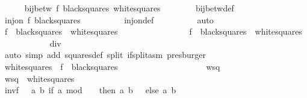 \begin{isabellebody}
\ \ \ \ \isamarkupfalse%
\ {\isachardoublequoteopen}bij{\isacharunderscore}betw\ {\isacharquery}f\ {\isacharquery}black{\isacharunderscore}squares\ {\isacharquery}white{\isacharunderscore}squares{\isachardoublequoteclose}\isanewline
\ \ \ \ \ \ \isamarkupfalse%
\ bij{\isacharunderscore}betw{\isacharunderscore}def\isanewline
\ \ \ \ \isamarkupfalse%
\isanewline
\ \ \ \ \ \ \isamarkupfalse%
\ {\isachardoublequoteopen}inj{\isacharunderscore}on\ {\isacharquery}f\ {\isacharquery}black{\isacharunderscore}squares{\isachardoublequoteclose}\isanewline
\ \ \ \ \ \ \ \ \isamarkupfalse%
\ inj{\isacharunderscore}on{\isacharunderscore}def\isanewline
\ \ \ \ \ \ \ \ \isamarkupfalse%
\ auto\isanewline
\ \ \ \ \isamarkupfalse%
\isanewline
\ \ \ \ \ \ \isamarkupfalse%
\ {\isachardoublequoteopen}{\isacharquery}f\ {\isacharbackquote}\ {\isacharquery}black{\isacharunderscore}squares\ {\isacharequal}\ {\isacharquery}white{\isacharunderscore}squares{\isachardoublequoteclose}\isanewline
\ \ \ \ \ \ \isamarkupfalse%
\isanewline
\ \ \ \ \ \ \ \ \isamarkupfalse%
\ {\isachardoublequoteopen}{\isacharquery}f\ {\isacharbackquote}\ {\isacharquery}black{\isacharunderscore}squares\ {\isasymsubseteq}\ {\isacharquery}white{\isacharunderscore}squares{\isachardoublequoteclose}\isanewline
\ \ \ \ \ \ \ \ \ \ \isamarkupfalse%
\ div{}\isanewline
\ \ \ \ \ \ \ \ \ \ \isamarkupfalse%
\ {\isacharparenleft}auto\ simp\ add{\isacharcolon}\ squares{\isacharunderscore}def\ split{\isacharcolon}\ if{\isacharunderscore}split{\isacharunderscore}asm{\isacharparenright}\ presburger{\isacharplus}\isanewline
\ \ \ \ \ \ \isamarkupfalse%
\isanewline
\ \ \ \ \ \ \ \ \isamarkupfalse%
\ {\isachardoublequoteopen}{\isacharquery}white{\isacharunderscore}squares\ {\isasymsubseteq}\ {\isacharquery}f\ {\isacharbackquote}\ {\isacharquery}black{\isacharunderscore}squares{\isachardoublequoteclose}\isanewline
\ \ \ \ \ \ \ \ \isamarkupfalse%
\isanewline
\ \ \ \ \ \ \ \ \ \ \isamarkupfalse%
\ wsq\isanewline
\ \ \ \ \ \ \ \ \ \ \isamarkupfalse%
\ {\isachardoublequoteopen}wsq\ {\isasymin}\ {\isacharquery}white{\isacharunderscore}squares{\isachardoublequoteclose}\isanewline
\ \ \ \ \ \ \ \ \ \ \isamarkupfalse%
\ {\isacharquery}invf\ {\isacharequal}\ {\isachardoublequoteopen}{\isasymlambda}\ {\isacharparenleft}a{\isacharcomma}\ b{\isacharparenright}{\isachardot}\ if\ a\ mod\ {}\ {\isacharequal}\ {}\ then\ {\isacharparenleft}a{\isacharcomma}\ b\ {\isacharminus}\ {}{\isacharparenright}\ else\ {\isacharparenleft}a{\isacharcomma}\ b\ {\isacharplus}\ {}{\isacharparenright}{\isachardoublequoteclose}\isanewline

\end{isabellebody}
